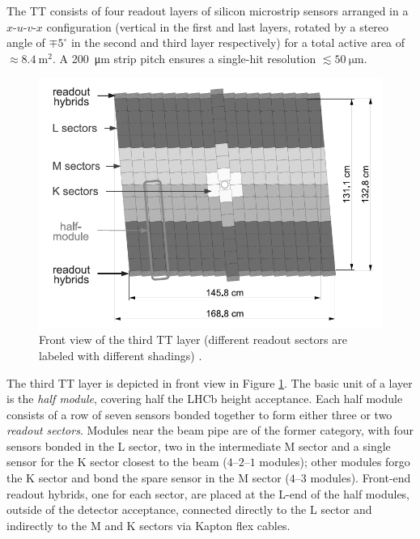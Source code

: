 The TT consists of four readout layers of silicon microstrip sensors arranged in a $x$-$u$-$v$-$x$ configuration (vertical in the first and last layers, rotated by a stereo angle of $\mp 5^\circ$ in the second and third layer respectively) for a total active area of $\approx \SI{8.4}{\meter\squared}$.
A \SI{200}{\micro\meter} strip pitch ensures a single-hit resolution $\lesssim \SI{50}{\micro\meter}$.

\begin{figure}[t]
	\centering
	\includegraphics[width=.6\textwidth]{graphics/02-lhcb/TT_layout.png}
	\caption[Front view of the third TT layer.]{Front view of the third TT layer (different readout sectors are labeled with different shadings) \cite{Alves:1129809}.}
	\label{fig:2:TT}
\end{figure}

The third TT layer is depicted in front view in Figure \ref{fig:2:TT}.
The basic unit of a layer is the \textit{half module}, covering half the LHCb height acceptance.
Each half module consists of a row of seven sensors bonded together to form either three or two \textit{readout sectors}.
Modules near the beam pipe are of the former category, with four sensors bonded in the L sector, two in the intermediate M sector and a single sensor for the K sector closest to the beam ($4$--$2$--$1$ modules);
other modules forgo the K sector and bond the spare sensor in the M sector ($4$--$3$ modules).
Front-end readout hybrids, one for each sector, are placed at the L-end of the half modules, outside of the detector acceptance, connected directly to the L sector and indirectly to the M and K sectors via Kapton flex cables.

